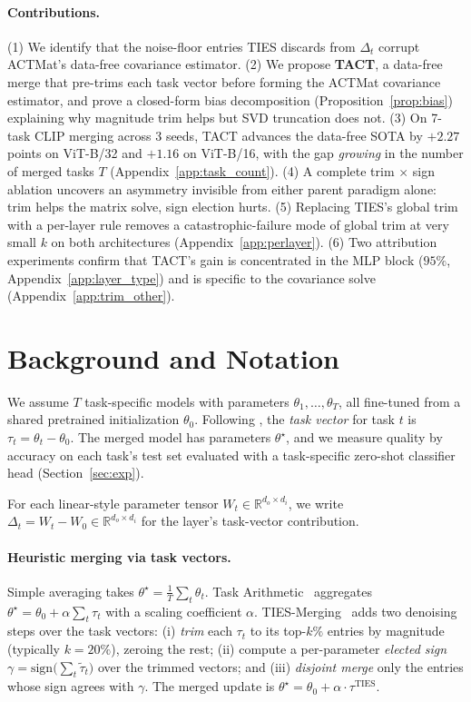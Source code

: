 \documentclass{article}
\theoremstyle{plain}
\theoremstyle{definition}
\theoremstyle{remark}
\begin{document}
\paragraph{Contributions.} (1) We identify that the noise-floor entries TIES discards from $\Delta_t$ corrupt ACTMat's data-free covariance estimator. (2) We propose \textbf{TACT}, a data-free merge that pre-trims each task vector before forming the ACTMat covariance estimator, and prove a closed-form bias decomposition (Proposition~\ref{prop:bias}) explaining why magnitude trim helps but SVD truncation does not. (3) On 7-task CLIP merging across 3 seeds, TACT advances the data-free SOTA by $+2.27$ points on ViT-B/32 and $+1.16$ on ViT-B/16, with the gap \emph{growing} in the number of merged tasks $T$ (Appendix~\ref{app:task_count}). (4) A complete trim$\,\times\,$sign ablation uncovers an asymmetry invisible from either parent paradigm alone: trim helps the matrix solve, sign election hurts. (5) Replacing TIES's global trim with a per-layer rule removes a catastrophic-failure mode of global trim at very small $k$ on both architectures (Appendix~\ref{app:perlayer}). (6) Two attribution experiments confirm that TACT's gain is concentrated in the MLP block ($95\%$, Appendix~\ref{app:layer_type}) and is specific to the covariance solve (Appendix~\ref{app:trim_other}).

\section{Background and Notation}
\label{sec:background}

We assume $T$ task-specific models with parameters $\theta_1,\dots,\theta_T$, all fine-tuned from a shared pretrained initialization $\theta_0$. Following \citet{ilharco2023editing}, the \emph{task vector} for task $t$ is $\tau_t = \theta_t - \theta_0$. The merged model has parameters $\theta^\star$, and we measure quality by accuracy on each task's test set evaluated with a task-specific zero-shot classifier head (Section~\ref{sec:exp}).

For each linear-style parameter tensor $W_t \in \mathbb{R}^{d_o \times d_i}$, we write $\Delta_t = W_t - W_0 \in \mathbb{R}^{d_o \times d_i}$ for the layer's task-vector contribution.

\paragraph{Heuristic merging via task vectors.}
Simple averaging takes $\theta^\star = \frac{1}{T}\sum_t \theta_t$. Task Arithmetic~\citep{ilharco2023editing} aggregates $\theta^\star = \theta_0 + \alpha \sum_t \tau_t$ with a scaling coefficient $\alpha$. TIES-Merging~\citep{yadav2023ties} adds two denoising steps over the task vectors: (i) \emph{trim} each $\tau_t$ to its top-$k\%$ entries by magnitude (typically $k=20\%$), zeroing the rest; (ii) compute a per-parameter \emph{elected sign} $\gamma = \mathrm{sign}\big(\sum_t \tilde{\tau}_t\big)$ over the trimmed vectors; and (iii) \emph{disjoint merge} only the entries whose sign agrees with $\gamma$. The merged update is $\theta^\star = \theta_0 + \alpha \cdot \tau^{\text{TIES}}$.
\end{document}
